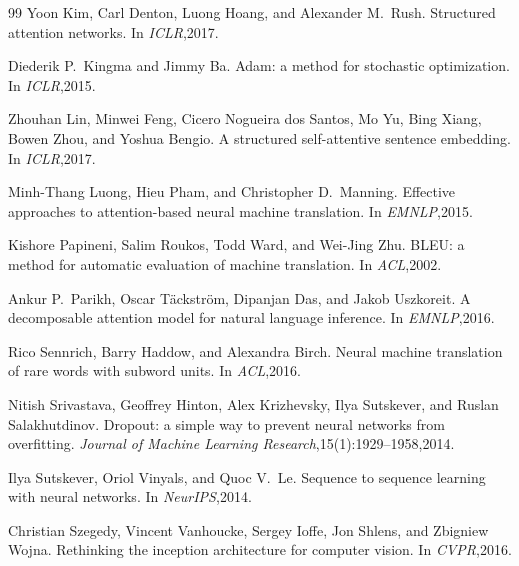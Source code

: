 ﻿\documentclass{article}
\begin{document}
\begin{thebibliography}{99}
Yoon Kim, Carl Denton, Luong Hoang, and Alexander M.\ Rush.
\newblock Structured attention networks.
\newblock In \emph{ICLR},2017.

Diederik P.\ Kingma and Jimmy Ba.
\newblock Adam: a method for stochastic optimization.
\newblock In \emph{ICLR},2015.

Zhouhan Lin, Minwei Feng, Cicero Nogueira dos Santos, Mo Yu, Bing Xiang, Bowen Zhou, and Yoshua Bengio.
\newblock A structured self-attentive sentence embedding.
\newblock In \emph{ICLR},2017.

Minh-Thang Luong, Hieu Pham, and Christopher D.\ Manning.
\newblock Effective approaches to attention-based neural machine translation.
\newblock In \emph{EMNLP},2015.

Kishore Papineni, Salim Roukos, Todd Ward, and Wei-Jing Zhu.
\newblock BLEU: a method for automatic evaluation of machine translation.
\newblock In \emph{ACL},2002.

Ankur P.\ Parikh, Oscar T{\"a}ckstr{\"o}m, Dipanjan Das, and Jakob Uszkoreit.
\newblock A decomposable attention model for natural language inference.
\newblock In \emph{EMNLP},2016.

Rico Sennrich, Barry Haddow, and Alexandra Birch.
\newblock Neural machine translation of rare words with subword units.
\newblock In \emph{ACL},2016.

Nitish Srivastava, Geoffrey Hinton, Alex Krizhevsky, Ilya Sutskever, and Ruslan Salakhutdinov.
\newblock Dropout: a simple way to prevent neural networks from overfitting.
\newblock \emph{Journal of Machine Learning Research},15(1):1929--1958,2014.

Ilya Sutskever, Oriol Vinyals, and Quoc V.\ Le.
\newblock Sequence to sequence learning with neural networks.
\newblock In \emph{NeurIPS},2014.

Christian Szegedy, Vincent Vanhoucke, Sergey Ioffe, Jon Shlens, and Zbigniew Wojna.
\newblock Rethinking the inception architecture for computer vision.
\newblock In \emph{CVPR},2016.


\end{thebibliography}
\end{document}
